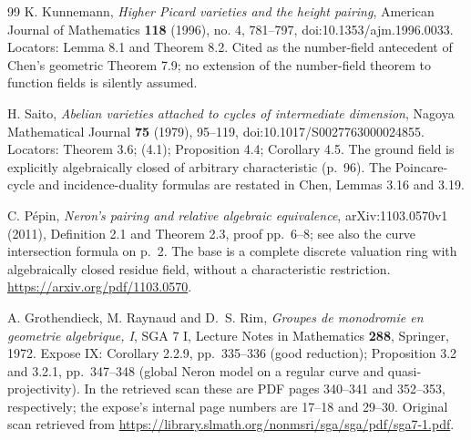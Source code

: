 \documentclass[11pt,a4paper]{article}
\theoremstyle{definition}
\theoremstyle{remark}
\begin{document}
\begin{thebibliography}{99}
K. Kunnemann, \emph{Higher Picard varieties and the height pairing},
American Journal of Mathematics \textbf{118} (1996), no. 4,
781--797, doi:10.1353/ajm.1996.0033.  Locators: Lemma 8.1 and
Theorem 8.2.  Cited as the number-field antecedent of Chen's
geometric Theorem 7.9; no extension of the number-field theorem
to function fields is silently assumed.

H. Saito, \emph{Abelian varieties attached to cycles of intermediate
dimension}, Nagoya Mathematical Journal \textbf{75} (1979),
95--119, doi:10.1017/S0027763000024855.
Locators: Theorem 3.6; (4.1); Proposition 4.4; Corollary 4.5.
The ground field is explicitly algebraically closed of arbitrary
characteristic (p.~96).  The Poincare-cycle and incidence-duality
formulas are restated in Chen, Lemmas 3.16 and 3.19.

C. P\'epin, \emph{Neron's pairing and relative algebraic equivalence},
arXiv:1103.0570v1 (2011), Definition 2.1 and Theorem 2.3,
proof pp.~6--8; see also the curve intersection formula on p.~2.
The base is a complete discrete valuation ring with algebraically
closed residue field, without a characteristic restriction.
\url{https://arxiv.org/pdf/1103.0570}.

A. Grothendieck, M. Raynaud and D.~S. Rim,
\emph{Groupes de monodromie en geometrie algebrique, I},
SGA 7 I, Lecture Notes in Mathematics \textbf{288}, Springer, 1972.
Expose IX: Corollary 2.2.9, pp.~335--336 (good reduction);
Proposition 3.2 and 3.2.1, pp.~347--348 (global Neron model on a
regular curve and quasi-projectivity).  In the retrieved scan these
are PDF pages 340--341 and 352--353, respectively; the expose's
internal page numbers are 17--18 and 29--30.
Original scan retrieved from
\url{https://library.slmath.org/nonmsri/sga/sga/pdf/sga7-1.pdf}.


\end{thebibliography}
\end{document}
